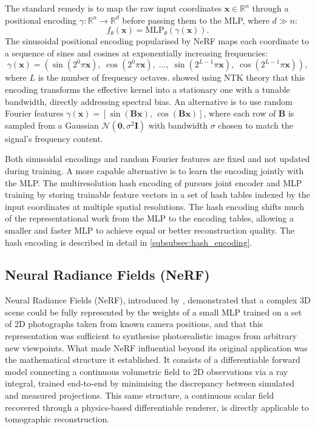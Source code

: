 \documentclass[12pt, a4paper, twoside]{report}
\begin{document}
The standard remedy is to map the raw input coordinates $\mathbf{x} \in \mathbb{R}^n$ through a positional encoding $\gamma : \mathbb{R}^n \to \mathbb{R}^d$ before passing them to the MLP, where $d \gg n$:
%
\begin{equation}
    f_\theta(\mathbf{x}) = \mathrm{MLP}_\theta\!\left(\gamma(\mathbf{x})\right).
    \label{eq:inr_with_encoding}
\end{equation}
%
The sinusoidal positional encoding popularised by NeRF \citep{mildenhall2021nerf} maps each coordinate to a sequence of sines and cosines at exponentially increasing frequencies:
%
\begin{equation}
    \gamma(\mathbf{x}) = \left(
        \sin(2^0 \pi \mathbf{x}),\;
        \cos(2^0 \pi \mathbf{x}),\;
        \ldots,\;
        \sin(2^{L-1} \pi \mathbf{x}),\;
        \cos(2^{L-1} \pi \mathbf{x})
    \right),
    \label{eq:sinusoidal_encoding}
\end{equation}
%
where $L$ is the number of frequency octaves. \citet{tancik2020fourier} showed using NTK theory that this encoding transforms the effective kernel into a stationary one with a tunable bandwidth, directly addressing spectral bias. An alternative is to use random Fourier features $\gamma(\mathbf{x}) = [\sin(\mathbf{B}\mathbf{x}),\, \cos(\mathbf{B}\mathbf{x})]$, where each row of $\mathbf{B}$ is sampled from a Gaussian $\mathcal{N}(\mathbf{0}, \sigma^2 \mathbf{I})$ with bandwidth $\sigma$ chosen to match the signal's frequency content.

Both sinusoidal encodings and random Fourier features are fixed and not updated during training. A more capable alternative is to learn the encoding jointly with the MLP. The multiresolution hash encoding of \citet{mueller2022instant} pursues joint encoder and MLP training by storing trainable feature vectors in a set of hash tables indexed by the input coordinates at multiple spatial resolutions. The hash encoding shifts much of the representational work from the MLP to the encoding tables, allowing a smaller and faster MLP to achieve equal or better reconstruction quality. The hash encoding is described in detail in \cref{subsubsec:hash_encoding}.

\subsection{Neural Radiance Fields (NeRF)}
\label{subsec:nerf}

Neural Radiance Fields (NeRF), introduced by \citet{mildenhall2021nerf}, demonstrated that a complex 3D scene could be fully represented by the weights of a small MLP trained on a set of 2D photographs taken from known camera positions, and that this representation was sufficient to synthesise photorealistic images from arbitrary new viewpoints. What made NeRF influential beyond its original application was the mathematical structure it established. It consists of a differentiable forward model connecting a continuous volumetric field to 2D observations via a ray integral, trained end-to-end by minimising the discrepancy between simulated and measured projections. This same structure, a continuous scalar field recovered through a physics-based differentiable renderer, is directly applicable to tomographic reconstruction.
\end{document}
